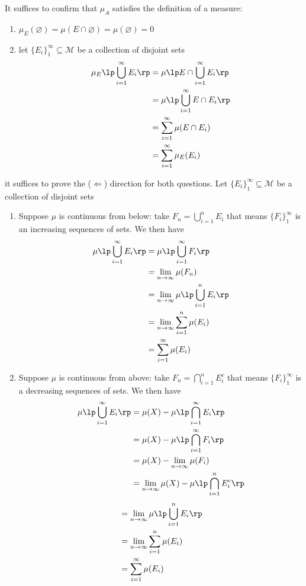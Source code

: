 \documentclass{pset}
\begin{document}
\begin{problem}
    It suffices to confirm that $\mu_A$ satisfies the definition of a measure:
    \begin{enumerate}
        \item $\mu_E(\varnothing)=\mu(E\cap\varnothing)=\mu(\varnothing)=0$
        \item let $\{E_i\}_1^\infty\subseteq\mathcal{M}$ be a collection of disjoint sets
        \begin{align*}
            \mu_E\lp\bigcup_{i=1}^\infty E_i\rp &= \mu\lp E\cap\bigcup_{i=1}^\infty E_i\rp \\
            &= \mu\lp\bigcup_{i=1}^\infty E\cap E_i\rp \\
            &= \sum_{i=1}^\infty\mu(E\cap E_i) \\
            &= \sum_{i=1}^\infty\mu_E(E_i)
        \end{align*}
    \end{enumerate}
\end{problem}
\begin{problem}
    it suffices to prove the ($\Leftarrow$) direction for both questions. Let $\{E_i\}_1^\infty\subseteq \mathcal{M}$ be a collection of disjoint sets
    \begin{enumerate}
        \item Suppose $\mu$ is continuous from below: take $F_n=\bigcup_{i=1}^nE_i$ that means $\{F_i\}_1^\infty$ is an increasing sequences of sets. We then have
        \begin{align*}
            \mu\lp\bigcup_{i=1}^\infty E_i\rp &= \mu\lp\bigcup_{i=1}^\infty F_i\rp \\
            &= \lim_{n\to \infty}\mu(F_n) \\
            &=\lim_{n\to\infty}\mu\lp\bigcup_{i=1}^nE_i\rp \\
            &=\lim_{n\to\infty}\sum_{i=1}^n\mu(E_i) \\
            &=\sum_{i=1}^\infty\mu(E_i)
        \end{align*}
        \item Suppose $\mu$ is continuous from above: take $F_n=\bigcap_{i=1}^nE^c_i$ that means $\{F_i\}_1^\infty$ is a decreasing sequences of sets. We then have
        \begin{align*}
            \mu\lp\bigcup_{i=1}^\infty E_i\rp &= \mu(X)-\mu\lp\bigcap_{i=1}^\infty E_i\rp \\
            &=\mu(X)-\mu\lp\bigcap_{i=1}^\infty F_i\rp \\
            &=\mu(X)-\lim_{n\to\infty}\mu(F_i) \\
            &= \lim_{n\to \infty}\mu(X)-\mu\lp\bigcap_{i=1}^nE^c_i\rp \\
        \end{align*}
        \begin{align*}
            &=\lim_{n\to\infty}\mu\lp\bigcup_{i=1}^nE_i\rp \\
            &=\lim_{n\to\infty}\sum_{i=1}^n\mu(E_i) \\
            &=\sum_{i=1}^\infty\mu(E_i)
        \end{align*}
    \end{enumerate}
\end{problem}
\end{document}
